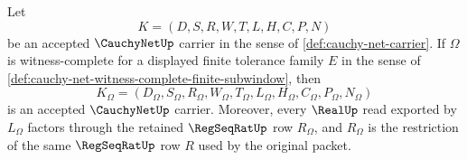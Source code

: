 \begin{theorem}
\label{thm:cauchy-net-finite-subwindow-restriction}
Let
$$
K=(D,S,R,W,T,L,H,C,P,N)
$$
be an accepted $\CauchyNetUp$ carrier in the sense of \autoref{def:cauchy-net-carrier}. If $\Omega$ is witness-complete for a displayed finite tolerance family $E$ in the sense of \autoref{def:cauchy-net-witness-complete-finite-subwindow}, then
$$
K_{\Omega}=(D_{\Omega},S_{\Omega},R_{\Omega},W_{\Omega},T_{\Omega},L_{\Omega},H_{\Omega},C_{\Omega},P_{\Omega},N_{\Omega})
$$
is an accepted $\CauchyNetUp$ carrier. Moreover, every $\RealUp$ read exported by $L_{\Omega}$ factors through the retained $\RegSeqRatUp$ row $R_{\Omega}$, and $R_{\Omega}$ is the restriction of the same $\RegSeqRatUp$ row $R$ used by the original packet.
\end{theorem}
